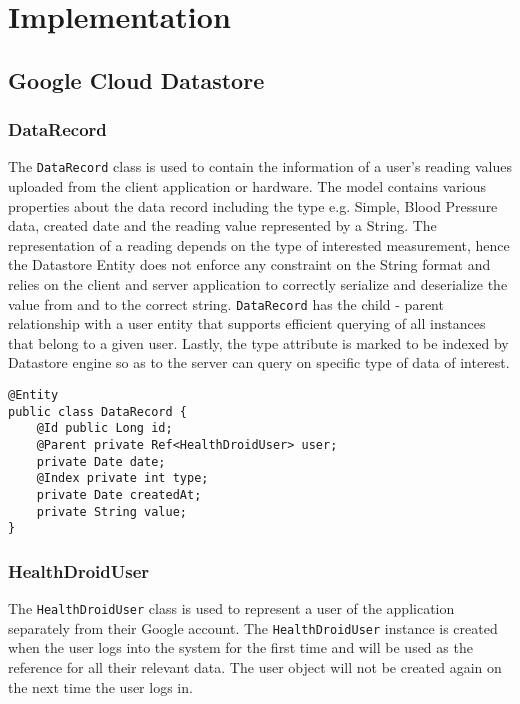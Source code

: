 \section{Implementation}
\subsection{Google Cloud Datastore}
\subsubsection{DataRecord}
The \texttt{DataRecord} class is used to contain the information of a user's reading values uploaded from the client
application or hardware. The model contains various properties about the data record including the type e.g. Simple,
Blood Pressure data, created date and the reading value represented by a String. The representation of a reading depends
on the type of interested measurement, hence the Datastore Entity does not enforce any constraint on the String format
and relies on the client and server application to correctly serialize and deserialize the value from and to the correct
string. \texttt{DataRecord} has the child - parent relationship with a user entity that supports efficient querying of
all instances that belong to a given user. Lastly, the type attribute is marked to be indexed by Datastore engine so as
to the server can query on specific type of data of interest.
\begin{minipage}{\linewidth}
\begin{lstlisting}
@Entity
public class DataRecord {
    @Id public Long id;
    @Parent private Ref<HealthDroidUser> user;
    private Date date;
    @Index private int type;
    private Date createdAt;
    private String value;
}
\end{lstlisting}
\end{minipage}

\subsubsection{HealthDroidUser}
The \texttt{HealthDroidUser} class is used to represent a user of the application separately from their Google account.
The \texttt{HealthDroidUser} instance is created when the user logs into the system for the first time and will be used
as the reference for all their relevant data. The user object will not be created again on the next time the user logs
in.

